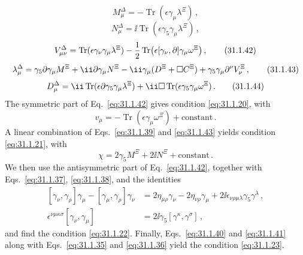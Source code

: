 \begin{equation}
  M_\mu^\Delta
  =-\operatorname{Tr}(\epsilon\gamma_\mu\lambda^\Xi)\,,
  \tag{31.1.40}\label{eq:31.1.40}
\end{equation}
\begin{equation}
  N_\mu^\Delta
  =\ii\operatorname{Tr}(\epsilon\gamma_5\gamma_\mu\lambda^\Xi)\,,
  \tag{31.1.41}\label{eq:31.1.41}
\end{equation}
\begin{equation}
  V_{\mu\nu}^\Delta
  =\operatorname{Tr}(\epsilon\gamma_\nu\gamma_\mu\lambda^\Xi)
   -\frac12\operatorname{Tr}
    \bigl(\epsilon[\gamma_\nu,\sl{\partial}]
      \gamma_\mu\omega^\Xi\bigr)\,,
  \tag{31.1.42}\label{eq:31.1.42}
\end{equation}
\begin{equation}
  \lambda_\mu^\Delta
  =\gamma_5\sl{\partial}\gamma_\mu M^\Xi
   +\ii\sl{\partial}\gamma_\mu N^\Xi
   -\ii\gamma_\mu(D^\Xi+\Box C^\Xi)
   +\gamma_5\gamma_\mu\partial^\nu V_\nu^\Xi\,,
  \tag{31.1.43}\label{eq:31.1.43}
\end{equation}
\begin{equation}
  D_\mu^\Delta
  =\ii\operatorname{Tr}
    (\epsilon\sl{\partial}\gamma_5\gamma_\mu\lambda^\Xi)
   +\ii\Box\operatorname{Tr}
    (\epsilon\gamma_5\gamma_\mu\omega^\Xi)\,.
  \tag{31.1.44}\label{eq:31.1.44}
\end{equation}
The symmetric part of Eq.~\eqref{eq:31.1.42} gives condition
\eqref{eq:31.1.20}, with
\begin{equation}
  v_\mu=-\operatorname{Tr}(\epsilon\gamma_\mu\omega^\Xi)
  +\text{constant}\,.
  \tag{31.1.45}\label{eq:31.1.45}
\end{equation}
A linear combination of Eqs.~\eqref{eq:31.1.39} and
\eqref{eq:31.1.43} yields condition \eqref{eq:31.1.21}, with
\begin{equation}
  \chi=2\gamma_5M^\Xi+2\ii N^\Xi+\text{constant}\,.
  \tag{31.1.46}\label{eq:31.1.46}
\end{equation}
We then use the antisymmetric part of Eq.~\eqref{eq:31.1.42}, together with
Eqs.~\eqref{eq:31.1.37}, \eqref{eq:31.1.38}, and the identities
\[
  \begin{aligned}
  [\gamma_\nu,\gamma_\rho]\gamma_\mu
  -[\gamma_\mu,\gamma_\rho]\gamma_\nu
  &=
  2\eta_{\mu\rho}\gamma_\nu-2\eta_{\nu\rho}\gamma_\mu
  +2\ii\epsilon_{\nu\rho\mu\lambda}\gamma_5\gamma^\lambda\,,
  \\
  \epsilon^{\nu\mu\kappa\sigma}[\gamma_\nu,\gamma_\mu]
  &=2\ii\gamma_5[\gamma^\kappa,\gamma^\sigma]\,,
  \end{aligned}
\]
and find the condition \eqref{eq:31.1.22}. Finally,
Eqs.~\eqref{eq:31.1.40} and \eqref{eq:31.1.41}\hfil\break
along with
Eqs.~\eqref{eq:31.1.35} and \eqref{eq:31.1.36} yield the condition
\eqref{eq:31.1.23}.
